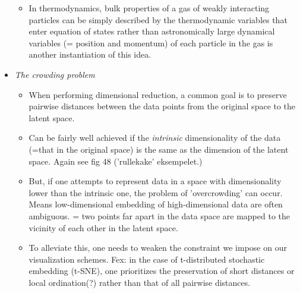 \documentclass[norsk,a4paper,11pt]{article}
\begin{document}
\begin{itemize}
\begin{itemize}
		\item In thermodynamics, bulk properties of a gas of weakly interacting particles can be simply described by the thermodynamic variables that enter equation of states rather than astronomically large dynamical variables (= position and momentum) of each particle in the gas is another instantiation of this idea.
	\end{itemize} 
	\item \textit{The crowding problem}
	\begin{itemize}
		\item When performing dimensional reduction, a common goal is to preserve pairwise distances between the data points from the original space to the latent space.
		\item Can be fairly well achieved if the \textit{intrinsic} dimensionality of the data (=that in the original space) is the same as the dimension of the latent space. Again see fig 48 ('rullekake' eksempelet.)
		\item But, if one attempts to represent data in a space with dimensionality lower than the intrinsic one, the problem of 'overcrowding' can occur. Means low-dimensional embedding of high-dimensional data are often ambiguous. = two points far apart in the data space are mapped to the vicinity of each other in the latent space. 
		\item To alleviate this, one needs to weaken the constraint we impose on our visualization schemes. Fex: in the case of t-distributed stochastic embedding (t-SNE), one prioritizes the preservation of short distances or local ordination(?) rather than that of all pairwise distances.
	\end{itemize}
\end{itemize}
\end{document}
